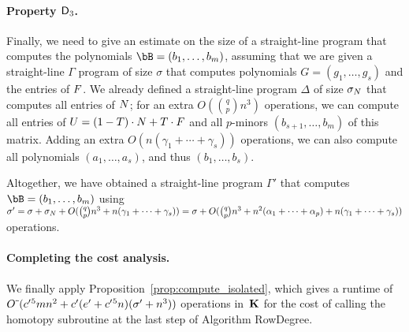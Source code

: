 \documentclass[12pt]{article}
\begin{document}
\paragraph{Property $\mathsf{D}_3$.} Finally, we need to give an estimate on
the size of a straight-line program that computes the polynomials
$\bB=(b_1,\dots,b_m)$, assuming that we are given a straight-line
$\Gamma$ program of size $\sigma$ that computes polynomials
$G=(g_1,\dots,g_s)$ and the entries of ${F}$. We already defined a
straight-line program $\Delta$  of size $\sigma_{{N}}$ that computes all entries of ${N}$; for
an extra $O({q \choose p} n^3)$ operations, we can compute all entries
of ${U}=(1-T)\cdot{N}+T\cdot{F}$ and all $p$-minors $(b_{s+1},\dots,b_m)$ of
this matrix.  Adding an extra $O(n(\gamma_1 + \cdots + \gamma_s))$
operations, we can also compute all polynomials $(a_1,\dots,a_s)$, and
thus $(b_1,\dots,b_s)$.

Altogether, we have obtained a straight-line program $\Gamma'$ that
computes $\bB=(b_1,\dots,b_m)$ using $\sigma'=\sigma + \sigma_{{N}} + O({q \choose p} n^3 + n(\gamma_1 + \cdots + \gamma_s))=\sigma +O( {q \choose p} n^3 + n^2
(\alpha_1+\cdots+\alpha_p) + n(\gamma_1 + \cdots + \gamma_s))$ operations.

\paragraph{Completing the cost analysis.} We finally apply Proposition~\ref{prop:compute_isolated},
which gives a runtime of ${O}{\,\tilde{ }\,}({c'}{}^5 m n^2 + {c'}{}({e'}{}+{c'}{}^5 n)(\sigma' + n^3))$
operations in~$\mathbf{K}$ for the cost of calling the homotopy
subroutine at the last step of Algorithm {\sf RowDegree}.
\end{document}
